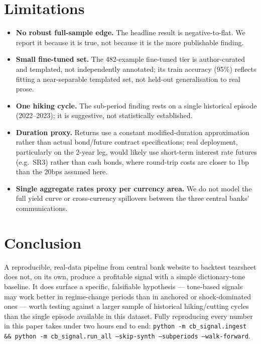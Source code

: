 \documentclass[11pt]{article}
\begin{document}
\section{Limitations}

\begin{itemize}
  \item \textbf{No robust full-sample edge.} The headline result is
    negative-to-flat. We report it because it is true, not because it is
    the more publishable finding.
  \item \textbf{Small fine-tuned set.} The 482-example fine-tuned tier is
    author-curated and templated, not independently annotated; its train
    accuracy (95\%) reflects fitting a near-separable templated set, not
    held-out generalisation to real prose.
  \item \textbf{One hiking cycle.} The sub-period finding rests on a
    single historical episode (2022--2023); it is suggestive, not
    statistically established.
  \item \textbf{Duration proxy.} Returns use a constant modified-duration
    approximation rather than actual bond/future contract specifications;
    real deployment, particularly on the 2-year leg, would likely use
    short-term interest rate futures (e.g.\ SR3) rather than cash bonds,
    where round-trip costs are closer to 1bp than the 20bps assumed here.
  \item \textbf{Single aggregate rates proxy per currency area.} We do not
    model the full yield curve or cross-currency spillovers between the
    three central banks' communications.
\end{itemize}

\section{Conclusion}

A reproducible, real-data pipeline from central bank website to backtest
tearsheet does not, on its own, produce a profitable signal with a simple
dictionary-tone baseline. It does surface a specific, falsifiable
hypothesis --- tone-based signals may work better in regime-change periods
than in anchored or shock-dominated ones --- worth testing against a
larger sample of historical hiking/cutting cycles than the single episode
available in this dataset. Fully reproducing every number in this paper
takes under two hours end to end:
\texttt{python -m cb\_signal.ingest \&\& python -m cb\_signal.run\_all
--skip-synth --subperiods --walk-forward}.



\end{document}
